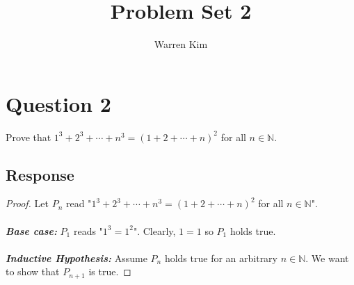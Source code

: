 \message{ !name(Problem_Set_2.tex)}\documentclass[13pt]{article}
\title{Problem Set 2}
\author{Warren Kim}
\begin{document}

\maketitle

\newpage
\section*{Question 2}
Prove that $1^3 + 2^3 + \cdots + n^3 = (1 + 2 + \cdots + n)^2$ for all $n \in \mathbb{N}$.
\subsection*{Response}
\begin{proof}
  Let $P_n$ read "$1^3 + 2^3 + \cdots + n^3 = (1 + 2 + \cdots + n)^2$ for all $n \in \mathbb{N}$". \\ \\
  \textit{\textbf{Base case:}} $P_1$ reads "$1^3 = 1^2$". Clearly, $1 = 1$ so $P_1$ holds true. \\ \\
  \textit{\textbf{Inductive Hypothesis:}} Assume $P_n$ holds true for an arbitrary $n \in \mathbb{N}$.
  We want to show that $P_{n + 1}$ is true.


\end{proof}
\end{document}
